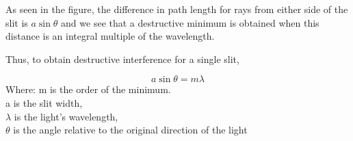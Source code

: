 \documentclass[a4paper,12pt]{book}
\def\tick#1#2{\draw[thick] (#1) ++ (#2:0.1) --++ (#2-180:0.2)}
\begin{document}
  
  

As seen in the figure, the difference in path length for rays from either side of the slit is  $a \sin{\theta}$  and we see that a destructive minimum is obtained when this distance is an integral multiple of the wavelength.

Thus, to obtain destructive interference for a single slit,

$$ a \sin{\theta} = m \lambda$$ 
Where:
m is the order of the minimum.\\
a is the slit width,\\
$\lambda$  is the light’s wavelength,\\
$\theta$  is the angle relative to the original direction of the light\\

 
 
 
\end{document}
